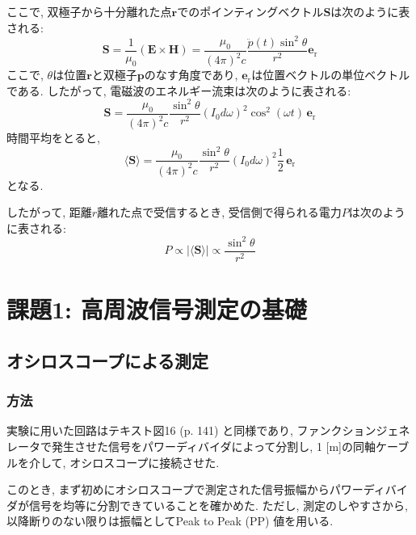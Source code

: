 \documentclass[uplatex,dvipdfmx,a4j,12pt]{jsarticle}
\begin{document}
ここで, 双極子から十分離れた点$\mathbf{r}$でのポインティングベクトル$\mathbf{S}$は次のように表される:
\begin{equation}
  \mathbf{S} = \frac{1}{\mu_0}\left(\mathbf{E} \times \mathbf{H}\right) =
  \frac{\mu_0}{(4\pi)^2c} \frac{\ddot{p}(t)\sin^2\theta}{r^2}\mathbf{e}_\mathrm{r}
\end{equation}
ここで, $\theta$は位置$\mathbf{r}$と双極子$\mathbf{p}$のなす角度であり, $\mathbf{e}_\mathrm{r}$は位置ベクトルの単位ベクトルである.
したがって, 電磁波のエネルギー流束は次のように表される:
\begin{equation}
  \mathbf{S} = \frac{\mu_0}{(4\pi)^2c} \frac{\sin^2\theta}{r^2}(I_0 d \omega)^2 \cos^2\left(\omega t\right)\,\mathbf{e}_\mathrm{r}
\end{equation}
時間平均をとると,
\begin{equation}
  \langle \mathbf{S} \rangle = \frac{\mu_0}{(4\pi)^2c} \frac{\sin^2\theta}{r^2}(I_0 d \omega)^2 \frac{1}{2}\,\mathbf{e}_\mathrm{r}
\end{equation}
となる.

したがって, 距離$r$離れた点で受信するとき, 受信側で得られる電力$P$は次のように表される:
\begin{equation}
  P \propto |\langle \mathbf{S} \rangle| \propto \frac{\sin^2\theta}{r^2} \label{eq:power_received}
\end{equation}

\section{課題1: 高周波信号測定の基礎}
\subsection{オシロスコープによる測定}
\subsubsection{方法}
実験に用いた回路はテキスト図16 (p. 141) と同様であり, ファンクションジェネレータで発生させた信号をパワーディバイダによって分割し, 1 [m]の同軸ケーブルを介して, オシロスコープに接続させた.

このとき, まず初めにオシロスコープで測定された信号振幅からパワーディバイダが信号を均等に分割できていることを確かめた.
ただし, 測定のしやすさから, 以降断りのない限りは振幅としてPeak to Peak (PP) 値を用いる.
\end{document}
